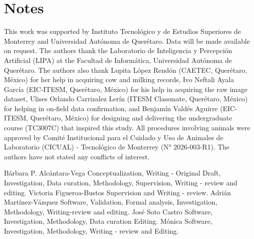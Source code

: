 \section{Notes}

This work was supported by Instituto Tecnológico y de Estudios Superiores de Monterrey and Universidad Autónoma de Querétaro.
Data will be made available on request.
The authors thank the Laboratorio de Inteligencia y Percepción Artificial (LIPA) at the Facultad de Informática, Universidad Autónoma de Querétaro.
The authors also thank Lupita López Rendón (CAETEC, Querétaro, México) for her help in acquiring cow and milking records, Ivo Neftali Ayala García (EIC-ITESM, Querétaro, México) for his help in acquiring the raw image dataset, Ulises Orlando Carrizalez Lerín (ITESM Classmate, Querétaro, México) for helping in on-field data confirmation, and Benjamín Valdés Aguirre (EIC-ITESM, Querétaro, México) for designing and delivering the undergraduate course (TC3007C) that inspired this study.
All procedures involving animals were approved by Comité Institucional para el Cuidado y Uso de Animales de Laboratorio (CICUAL) - Tecnológico de Monterrey (N° 2026-003-R1).
The authors have not stated any conflicts of interest.

Bárbara P. Alcántara-Vega\mE{,} Conceptualization, Writing - Original Draft, Investigation, Data curation, Methodology, Supervision, Writing - review and editing.
Victoria Figueroa-Bustos\mE{,} Supervision and Writing - review.
Adrián Martínez-Vázquez\mE{,} Software, Validation, Formal analysis, Investigation, Methodology, Writing-review and editing.
 José Soto Castro\mE{,} Software, Investigation, Methodology, Data curation Editing.
Mónica  Software, Investigation, Methodology, Writing - review and Editing.

